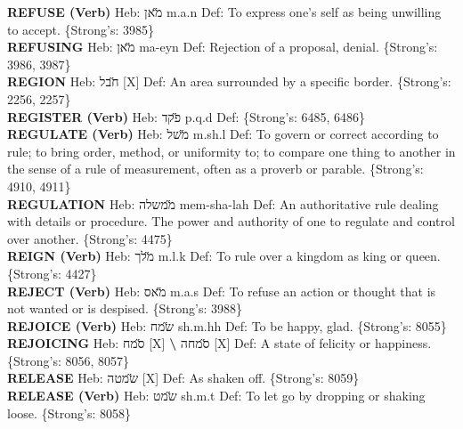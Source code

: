 {\textbf{REFUSE (Verb)} Heb: {\large\H מאן} m.a.n Def: To express one's self as being unwilling to accept. \{Strong's: 3985\}\hfill{}\\

\textbf{REFUSING} Heb: {\large\H מאן} ma-eyn Def: Rejection of a proposal, denial. \{Strong's: 3986, 3987\}\hfill{}\\

\textbf{REGION} Heb: {\large\H חבל} {[}X{]} Def: An area surrounded by a specific border. \{Strong's: 2256, 2257\}\hfill{}\\

\textbf{REGISTER (Verb)} Heb: {\large\H פקד} p.q.d Def: \{Strong's: 6485, 6486\}\hfill{}\\

\textbf{REGULATE (Verb)} Heb: {\large\H משל} m.sh.l Def: To govern or correct according to rule; to bring order, method, or uniformity to; to compare one thing to another in the sense of a rule of measurement, often as a proverb or parable. \{Strong's: 4910, 4911\}\hfill{}\\

\textbf{REGULATION} Heb: {\large\H ממשלה} mem-sha-lah Def: An authoritative rule dealing with details or procedure. The power and authority of one to regulate and control over another. \{Strong's: 4475\}\hfill{}\\

\textbf{REIGN (Verb)} Heb: {\large\H מלך} m.l.k Def: To rule over a kingdom as king or queen. \{Strong's: 4427\}\hfill{}\\

\textbf{REJECT (Verb)} Heb: {\large\H מאס} m.a.s Def: To refuse an action or thought that is not wanted or is despised. \{Strong's: 3988\}\hfill{}\\

\textbf{REJOICE (Verb)} Heb: {\large\H שמח} sh.m.hh Def: To be happy, glad. \{Strong's: 8055\}\hfill{}\\

\textbf{REJOICING} Heb: {\large\H סמח} {[}X{]} \textbf{\textbackslash{}} {\large\H סמחה} {[}X{]} Def: A state of felicity or happiness. \{Strong's: 8056, 8057\}\hfill{}\\

\textbf{RELEASE} Heb: {\large\H שמטה} {[}X{]} Def: As shaken off. \{Strong's: 8059\}\hfill{}\\

\textbf{RELEASE (Verb)} Heb: {\large\H שמט} sh.m.t Def: To let go by dropping or shaking loose. \{Strong's: 8058\}\hfill{}\\

}
